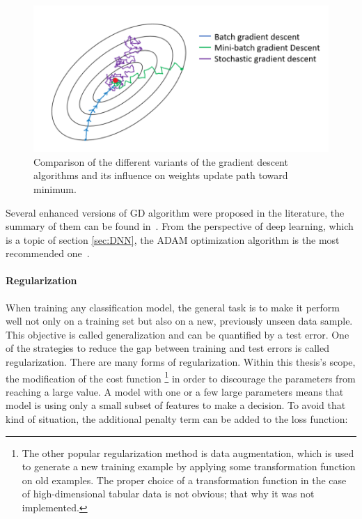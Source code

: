 
\begin{figure}[!h]
\centering
\includegraphics{figures/batch_descent.png}
\caption{Comparison of the different variants of the gradient descent algorithms and its influence on weights update path toward minimum.
\label{fig:Batch gradient decent}}
\end{figure}


Several enhanced versions of GD algorithm were proposed in the literature, the summary of them can be found in~\cite{GradientDescent}. 
From the perspective of deep learning, which is a topic of section \ref{sec:DNN}, the ADAM optimization algorithm is the most recommended one~\cite{ADAM}. 

\paragraph{Regularization} \mbox{}
\label{sec:regularization}
When training any classification model, the general task is to make it perform well not only on a training set but also on a new, previously unseen data sample. This objective is called generalization and can be quantified by a test error. One of the strategies to reduce the gap between training and test errors is called regularization. There are many forms of regularization. Within this thesis's scope, the modification of the cost function \footnote{The other popular regularization method is data augmentation, which is used to generate a new training example by applying some transformation function on old examples. The proper choice of a transformation function in the case of high-dimensional tabular data is not obvious; that why it was not implemented.} in order to discourage the parameters from reaching a large value. A model with one or a few large parameters means that model is using only a small subset of features to make a decision. To avoid that kind of situation, the additional penalty term can be added to the loss function: 


